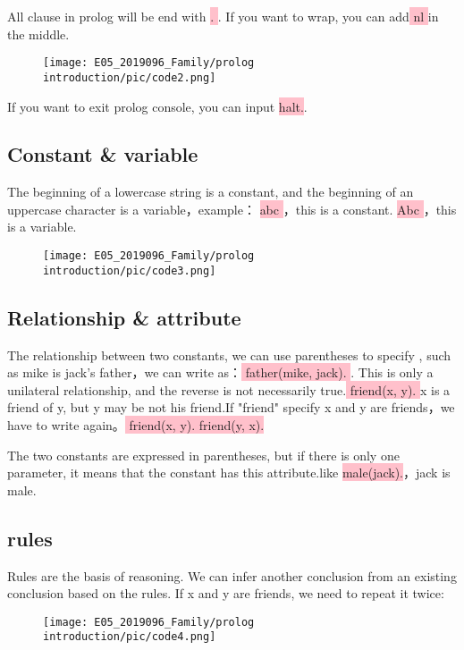\documentclass[a4paper, 11pt]{article}
\begin{document}
All clause in prolog will be end with \colorbox{pink}{\color{black} . }. If you want to wrap, you can add\colorbox{pink}{\color{black} nl }in the  middle.
\begin{figure}[H]
\centering
\texttt{[image: E05\_2019096\_Family/prolog introduction/pic/code2.png]}
\label{fig:label}
\end{figure}
If you want to exit prolog console, you can input \colorbox{pink}{\color{black} halt.}.

\subsection{Constant & variable}
The beginning of a lowercase string is a constant, and the beginning of an uppercase character is a variable，example：
\colorbox{pink}{\color{black} abc }，this is a constant.
\colorbox{pink}{\color{black} Abc }，this is a variable.
\begin{figure}[ht]
\centering
\texttt{[image: E05\_2019096\_Family/prolog introduction/pic/code3.png]}
\label{fig:label}
\end{figure}

\subsection{Relationship & attribute}
The relationship between two constants, we can use parentheses to specify , such as mike is jack's father，we can write as：\colorbox{pink}{\color{black} father(mike, jack). }. This is only a unilateral relationship, and the reverse is not necessarily true.\colorbox{pink}{\color{black} friend(x, y). }x is a friend of y, but y may be not his friend.If "friend" specify x and y are friends，we have to write again。\colorbox{pink}{\color{black} friend(x, y). friend(y, x). }

The two constants are expressed in parentheses, but if there is only one parameter, it means that the constant has this attribute.like \colorbox{pink}{\color{black} male(jack).}，jack is male.

\subsection{rules}
Rules are the basis of reasoning. We can infer another conclusion from an existing conclusion based on the rules.
If x and y are friends, we need to repeat it twice:
\begin{figure}[ht]
\centering
\texttt{[image: E05\_2019096\_Family/prolog introduction/pic/code4.png]}
\label{fig:label}
\end{figure}
\end{document}
